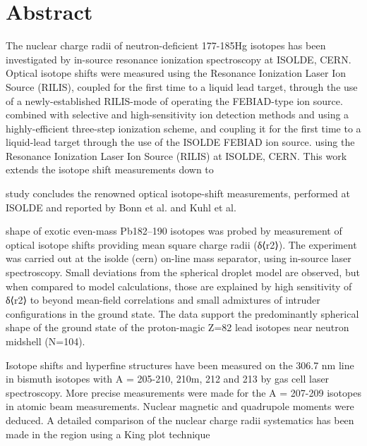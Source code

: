 \section{Abstract}
The nuclear charge radii of neutron-deficient 177-185Hg isotopes has been investigated by in-source resonance ionization spectroscopy at ISOLDE, CERN.  Optical isotope shifts were measured using the Resonance Ionization Laser Ion Source (RILIS), coupled for the first time to a liquid lead target, through the use of a newly-established RILIS-mode of operating the FEBIAD-type ion source.  combined with selective and high-sensitivity ion detection methods  and  using a highly-efficient three-step ionization scheme, and coupling it for the first time to a liquid-lead target through the use of the ISOLDE FEBIAD ion source.  using the Resonance Ionization Laser Ion Source (RILIS) at ISOLDE, CERN.  This work extends  the isotope shift measurements down to 

study concludes the renowned optical isotope-shift measurements, performed at ISOLDE and reported by Bonn et al. and Kuhl et al.

shape of exotic even-mass Pb182–190 isotopes was probed by measurement of optical isotope shifts providing mean square charge radii (δ⟨r2⟩). The experiment was carried out at the isolde (cern) on-line mass separator, using in-source laser spectroscopy. Small deviations from the spherical droplet model are observed, but when compared to model calculations, those are explained by high sensitivity of δ⟨r2⟩ to beyond mean-field correlations and small admixtures of intruder configurations in the ground state. The data support the predominantly spherical shape of the ground state of the proton-magic Z=82 lead isotopes near neutron midshell (N=104).


Isotope shifts and hyperfine structures have been measured on the 306.7 nm line in bismuth isotopes with A = 205-210, 210m, 212 and 213 by gas cell laser spectroscopy. More precise measurements were made for the A = 207-209 isotopes in atomic beam measurements. Nuclear magnetic and quadrupole moments were deduced. A detailed comparison of the nuclear charge radii systematics has been made in the region using a King plot technique